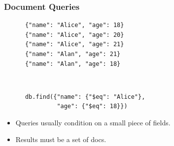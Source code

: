 \documentclass[lualatex]{beamer}
\begin{document}
\begin{frame}[fragile]
  \frametitle{Document Queries}
  \begin{center}
    \begin{verbatim}
      {"name": "Alice", "age": 18}
      {"name": "Alice", "age": 20}
      {"name": "Alice", "age": 21}
      {"name": "Alan", "age": 21}
      {"name": "Alan", "age": 18}
    \end{verbatim}
  \end{center}
  \begin{block}{~}
    \begin{verbatim}
      db.find({"name": {"$eq": "Alice"},
               "age": {"$eq": 18}})
    \end{verbatim}
    \begin{itemize}
      \item Queries usually condition on a small piece of fields.
      \item Results must be a set of docs.
    \end{itemize}
  \end{block}
\end{frame}
\end{document}
